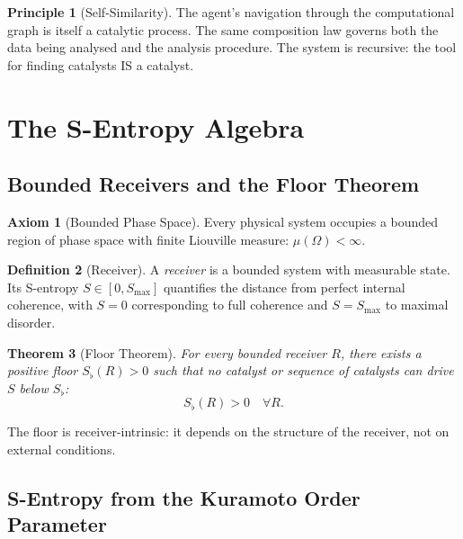 \documentclass[11pt,a4paper]{article}
\newtheorem{theorem}{Theorem}[section]
\theoremstyle{definition}
\newtheorem{definition}[theorem]{Definition}
\newtheorem{axiom}{Axiom}
\newtheorem{principle}[theorem]{Principle}
\theoremstyle{remark}
\newcommand{\Sfloor}{S_{\flat}}
\begin{document}
\begin{principle}[Self-Similarity]
The agent's navigation through the computational graph is itself a catalytic process. The same composition law governs both the data being analysed and the analysis procedure. The system is recursive: the tool for finding catalysts IS a catalyst.
\end{principle}

\section{The S-Entropy Algebra}
\label{sec:algebra}

\subsection{Bounded Receivers and the Floor Theorem}

\begin{axiom}[Bounded Phase Space]
\label{ax:bounded}
Every physical system occupies a bounded region of phase space with finite Liouville measure: $\mu(\Omega) < \infty$.
\end{axiom}

\begin{definition}[Receiver]
A \emph{receiver} is a bounded system with measurable state. Its S-entropy $S \in [0, S_{\max}]$ quantifies the distance from perfect internal coherence, with $S = 0$ corresponding to full coherence and $S = S_{\max}$ to maximal disorder.
\end{definition}

\begin{theorem}[Floor Theorem]
\label{thm:floor}
For every bounded receiver $R$, there exists a positive floor $\Sfloor(R) > 0$ such that no catalyst or sequence of catalysts can drive $S$ below $\Sfloor$:
\begin{equation}
\Sfloor(R) > 0 \quad \forall R.
\end{equation}
\end{theorem}

The floor is receiver-intrinsic: it depends on the structure of the receiver, not on external conditions.

\subsection{S-Entropy from the Kuramoto Order Parameter}
\end{document}
